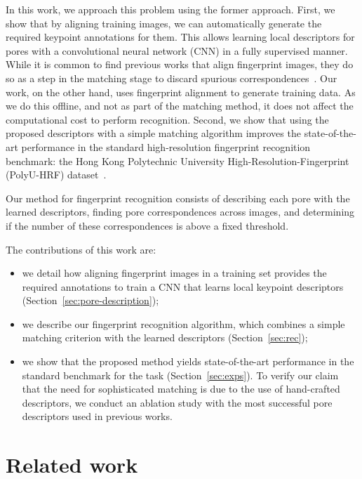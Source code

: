 \documentclass[10pt,twocolumn,letterpaper]{article}
\begin{document}
In this work, we approach this problem using the former approach.
First, we show that by aligning training images, we can automatically generate the required keypoint annotations for them.
This allows learning local descriptors for pores with a convolutional neural network (CNN) in a fully supervised manner.
While it is common to find previous works that align fingerprint images, they do so as a step in the matching stage to discard spurious correspondences~\cite{direct-pore, td-sparse}.
Our work, on the other hand, uses fingerprint alignment to generate training data.
As we do this offline, and not as part of the matching method, it does not affect the computational cost to perform recognition.
Second, we show that using the proposed descriptors with a simple matching algorithm improves the state-of-the-art performance in the standard high-resolution fingerprint recognition benchmark: the Hong Kong Polytechnic University High-Resolution-Fingerprint (PolyU-HRF) dataset~\cite{direct-pore}.

Our method for fingerprint recognition consists of describing each pore with the learned descriptors, finding pore correspondences across images, and determining if the number of these correspondences is above a fixed threshold.

The contributions of this work are:
\begin{itemize}
\item we detail how aligning fingerprint images in a training set provides the required annotations to train a CNN that learns local keypoint descriptors (Section~\ref{sec:pore-description});

\item we describe our fingerprint recognition algorithm, which combines a simple matching criterion with the learned descriptors (Section~\ref{sec:rec});

\item we show that the proposed method yields state-of-the-art performance in the standard benchmark for the task (Section~\ref{sec:exps}).
  To verify our claim that the need for sophisticated matching is due to the use of hand-crafted descriptors, we conduct an ablation study with the most successful pore descriptors used in previous works.
\end{itemize}

\section{Related work}
\label{sec:related-work}
\end{document}
